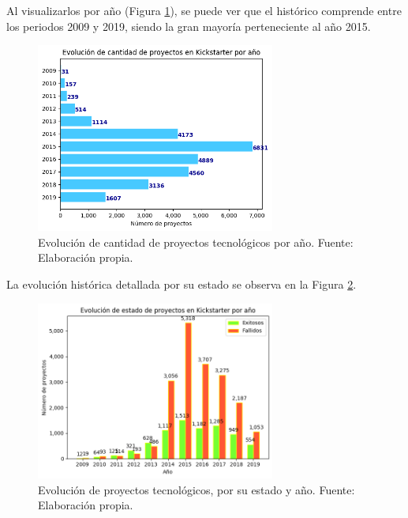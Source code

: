 Al visualizarlos por año (Figura \ref{4:fig12}), se puede ver que el histórico comprende entre los periodos 2009 y 2019, siendo la gran mayoría perteneciente al año 2015.

\begin{figure}[!ht]
	\begin{center}
		\includegraphics[width=0.7\textwidth]{4/figures/projects state by year.png}
		\caption{Evolución de cantidad de proyectos tecnológicos por año. Fuente: Elaboración propia.}
		\label{4:fig12}
	\end{center}
\end{figure}


La evolución histórica detallada por su estado se observa en la Figura \ref{4:fig13}.

\begin{figure}[!ht]
	\begin{center}
		\includegraphics[width=0.7\textwidth]{4/figures/projects state evolution by year.png}
		\caption{Evolución de proyectos tecnológicos, por su estado y año. Fuente: Elaboración propia.}
		\label{4:fig13}
	\end{center}
\end{figure}

